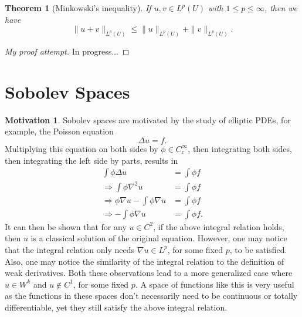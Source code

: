 \documentclass[11pt]{article}
\newtheorem{theorem}{Theorem}
\theoremstyle{definition}
\newtheorem*{motivation}{Motivation}
\begin{document}
\begin{theorem}[Minkowski's inequality]
	If $u,v \in L^p(U)$ with $1 \leq p \leq \infty$, then we have
	\begin{equation*}
		\|u+v\|_{L^p(U)} \leq \|u\|_{L^p(U)} + \|v\|_{L^p(U)}.
	\end{equation*}
\end{theorem}
\begin{proof}[My proof attempt]
	In progress...
\end{proof}


\newpage

\section{Sobolev Spaces}
\begin{motivation}
Sobolev spaces are motivated by the study of elliptic PDEs, for example, the Poisson equation
\[\Delta{u} = f.\]
Multiplying this equation on both sides by $\phi \in C_{c}^{\infty}$, then integrating both sides, then integrating the left side by parts, results in
\begin{equation*}
	\begin{aligned}
		\int \phi \Delta u &= \int \phi f \\
		\Rightarrow \int \phi \nabla^2 u &= \int \phi f \\
		\Rightarrow \phi \nabla u - \int \phi \nabla u &= \int \phi f \\ 
		\Rightarrow - \int \phi \nabla u &= \int \phi f.
	\end{aligned}
\end{equation*}
It can then be shown that for any $u \in C^2$, if the above integral relation holds, then $u$ is a classical solution of the original equation.
However, one may notice that the integral relation only needs $\nabla u \in L^p$, for some fixed $p$, to be satisfied.
Also, one may notice the similarity of the integral relation to the definition of weak derivatives. Both these observations lead to a more generalized
case where $u \in W^k$ and $u \not\in C^1$, for some fixed $p$.
A space of functions like this is very useful as the functions in these spaces don't necessarily need to be continuous or totally differentiable,
yet they still satisfy the above integral relation. 
\end{motivation}
\end{document}
